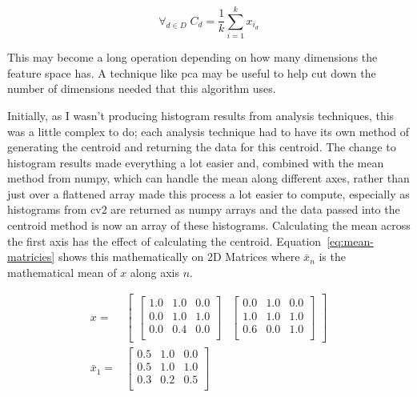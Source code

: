 \begin{equation}
\label{eq:sce}
\forall_{d \in D}\;C_d = \frac{1}{k}\sum^{k}_{i=1}{x_{i_{d}}}
\end{equation}

This may become a long operation depending on how many dimensions the feature space has. A
technique like \gls{pca}\cite{Jolliffe2002Principal} may be useful to help cut down the number of dimensions needed that this
algorithm uses.

Initially, as I wasn't producing histogram results from analysis techniques, this was a little
complex to do; each analysis technique had to have its own method of generating the centroid and
returning the data for this centroid. The change to histogram results made everything a lot easier
and, combined with the mean method from numpy, which can handle the mean along 
different axes, rather than just over a flattened array made this process a lot easier to compute,
especially as histograms from \gls{cv2} are returned as numpy arrays and the data passed into the centroid method is now an 
array of these histograms. Calculating the mean across the first axis has the effect of 
calculating the centroid. Equation~\ref{eq:mean-matricies} shows this mathematically on 2D 
Matrices where $\bar{x}_n$ is the mathematical mean of $x$ along axis $n$.

\begin{align}
x=&\begin{bmatrix}
\begin{bmatrix}
1.0 & 1.0 & 0.0 \\
0.0 & 1.0 & 1.0 \\
0.0 & 0.4 & 0.0 \\
\end{bmatrix} & 
\begin{bmatrix}
0.0 & 1.0 & 0.0 \\
1.0 & 1.0 & 1.0 \\
0.6 & 0.0 & 1.0 \\
\end{bmatrix}
\end{bmatrix} \nonumber \\
\bar{x}_1 =& 
\begin{bmatrix}
0.5 & 1.0 & 0.0 \\
0.5 & 1.0 & 1.0 \\
0.3 & 0.2 & 0.5 \\
\end{bmatrix}
\label{eq:mean-matricies}
\end{align}

